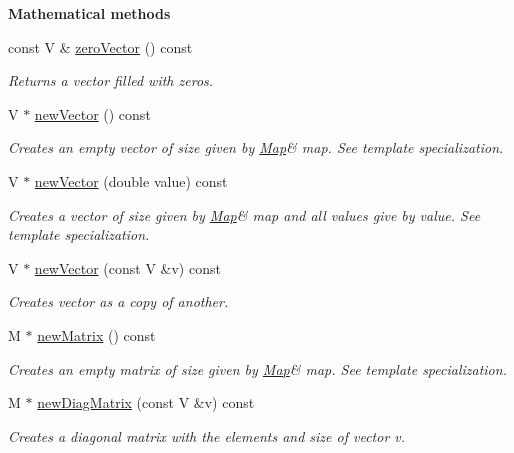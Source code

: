 \begin{Indent}{\bf Mathematical methods}\par
\begin{DoxyCompactItemize}
\item 
const V \& \hyperlink{class_q_u_e_s_o_1_1_vector_space_a92e963bb5cab3eecd290dfe4b8f03b04}{zero\-Vector} () const 
\begin{DoxyCompactList}\small\item\em Returns a vector filled with zeros. \end{DoxyCompactList}\item 
V $\ast$ \hyperlink{class_q_u_e_s_o_1_1_vector_space_a6fc1d08dfe902e83a011ea6a81aff439}{new\-Vector} () const 
\begin{DoxyCompactList}\small\item\em Creates an empty vector of size given by \hyperlink{class_q_u_e_s_o_1_1_map}{Map}\& map. See template specialization. \end{DoxyCompactList}\item 
V $\ast$ \hyperlink{class_q_u_e_s_o_1_1_vector_space_abc859a81265641b1f8676851fd2ab6bd}{new\-Vector} (double value) const 
\begin{DoxyCompactList}\small\item\em Creates a vector of size given by \hyperlink{class_q_u_e_s_o_1_1_map}{Map}\& map and all values give by {\ttfamily value}. See template specialization. \end{DoxyCompactList}\item 
V $\ast$ \hyperlink{class_q_u_e_s_o_1_1_vector_space_a7492fbcc76598ba956e45005ba7cd9cc}{new\-Vector} (const V \&v) const 
\begin{DoxyCompactList}\small\item\em Creates vector as a copy of another. \end{DoxyCompactList}\item 
M $\ast$ \hyperlink{class_q_u_e_s_o_1_1_vector_space_a8277f132ea382a7f49aa4a6ab7cbea1c}{new\-Matrix} () const 
\begin{DoxyCompactList}\small\item\em Creates an empty matrix of size given by \hyperlink{class_q_u_e_s_o_1_1_map}{Map}\& map. See template specialization. \end{DoxyCompactList}\item 
M $\ast$ \hyperlink{class_q_u_e_s_o_1_1_vector_space_a9f4ad174b63fbc0626070e0f38745e1e}{new\-Diag\-Matrix} (const V \&v) const 
\begin{DoxyCompactList}\small\item\em Creates a diagonal matrix with the elements and size of vector {\ttfamily v}. \end{DoxyCompactList}\item 

\end{DoxyCompactItemize}
\end{Indent}
